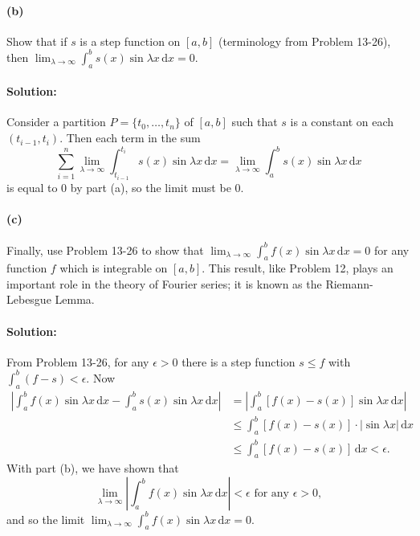 \documentclass{article}
\begin{document}
\paragraph{(b)} Show that if $s$ is a step function on $[a, b]$ (terminology
from Problem 13-26), then $\lim_{\lambda \rightarrow \infty} \int_a^b s(x)
\sin \lambda x \,\mathrm{d}x = 0$.

\paragraph{Solution:} Consider a partition $P = \{t_0, \ldots, t_n\}$ of $[a,
b]$ such that $s$ is a constant on each $(t_{i - 1}, t_i)$. Then each term in
the sum \begin{equation*}
  \sum_{i = 1}^n \lim_{\lambda \rightarrow \infty} \int_{t_{i - 1}}^{t_i}
  s(x) \sin \lambda x \,\mathrm{d}x
    = \lim_{\lambda \rightarrow \infty} \int_a^b s(x) \sin \lambda x
    \,\mathrm{d}x
\end{equation*} is equal to 0 by part (a), so the limit must be 0.

\paragraph{(c)} Finally, use Problem 13-26 to show that
$\lim_{\lambda \rightarrow \infty} \int_a^b f(x)\sin \lambda x \,\mathrm{d}x =
0$ for any function $f$ which is integrable on $[a, b]$. This result, like
Problem 12, plays an important role in the theory of Fourier series; it is
known as the Riemann-Lebesgue Lemma.

\paragraph{Solution:} From Problem 13-26, for any $\epsilon > 0$ there is a
step function $s \leq f$ with $\int_a^b (f - s) < \epsilon$. Now
\begin{align*}
  \left|\int_a^b f(x)\sin \lambda x \,\mathrm{d}x - \int_a^b s(x)\sin \lambda x
  \,\mathrm{d}x\right|
    &= \left|\int_a^b [f(x) - s(x)]\sin \lambda x \,\mathrm{d}x\right| \\
    &\leq \int_a^b [f(x) - s(x)] \cdot |\sin \lambda x| \,\mathrm{d}x \\
    &\leq \int_a^b [f(x) - s(x)] \,\mathrm{d}x < \epsilon.
\end{align*} With part (b), we have shown that \begin{equation*}
  \lim_{\lambda \rightarrow \infty} \left|\int_a^b f(x)\sin \lambda x
  \,\mathrm{d}x\right| < \epsilon \text{ for any } \epsilon > 0,
\end{equation*} and so the limit $\lim_{\lambda \rightarrow \infty} \int_a^b
f(x)\sin \lambda x \,\mathrm{d}x = 0$.
\end{document}
